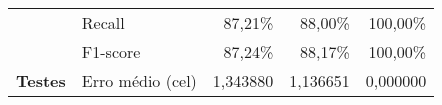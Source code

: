 \begin{table}[ht!]
{\begin{tabular}{l|l|rrr}
                                                            & Recall                                              & \multicolumn{1}{r|}{87,21\%}                                                 & \multicolumn{1}{r|}{88,00\%}                                                & 100,00\%                         \\
                                                            & F1-score                                            & \multicolumn{1}{r|}{87,24\%}                                                 & \multicolumn{1}{r|}{88,17\%}                                                & 100,00\%                         \\
            \multirow{-5}{*}{\textbf{Testes}}               & \cellcolor[HTML]{FFF5E1}Erro médio (\acrshort{cel}) & \multicolumn{1}{r|}{\cellcolor[HTML]{FFF5E1}1,343880}                        & \multicolumn{1}{r|}{\cellcolor[HTML]{FFF5E1}1,136651}                       & \cellcolor[HTML]{FFF5E1}0,000000 \\ \hline
        \end{tabular}%
    }
    \nomefonte{}
\end{table}